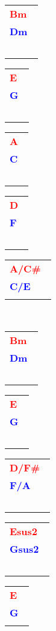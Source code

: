 \documentclass[12pt,a4paper,openany,UTF8]{memoir}
\begin{document}
\begin{tabular}[b]{l}
    \textbf{\textcolor{red}{Bm\ }}\\\textbf{\textcolor{blue}{Dm\ }}\\
    ~\mbox{}\end{tabular}\begin{tabular}[b]{l}
    \textbf{\textcolor{red}{E\ }}\\\textbf{\textcolor{blue}{G\ }}\\
    ~\mbox{}\end{tabular}\begin{tabular}[b]{l}
    \textbf{\textcolor{red}{A\ }}\\\textbf{\textcolor{blue}{C\ }}\\
    ~\mbox{}\end{tabular}\begin{tabular}[b]{l}
    \textbf{\textcolor{red}{D\ }}\\\textbf{\textcolor{blue}{F\ }}\\
    ~\mbox{}\end{tabular}\begin{tabular}[b]{l}
    \textbf{\textcolor{red}{A/C\#\ }}\\\textbf{\textcolor{blue}{C/E\ }}\\
    \mbox{}\end{tabular}\\
\begin{tabular}[b]{l}
    \textbf{\textcolor{red}{Bm\ }}\\\textbf{\textcolor{blue}{Dm\ }}\\
    ~\mbox{}\end{tabular}\begin{tabular}[b]{l}
    \textbf{\textcolor{red}{E\ }}\\\textbf{\textcolor{blue}{G\ }}\\
    ~\mbox{}\end{tabular}\begin{tabular}[b]{l}
    \textbf{\textcolor{red}{D/F\#\ }}\\\textbf{\textcolor{blue}{F/A\ }}\\
    ~\mbox{}\end{tabular}\begin{tabular}[b]{l}
    \textbf{\textcolor{red}{Esus2\ }}\\\textbf{\textcolor{blue}{Gsus2\ }}\\
    ~\mbox{}\end{tabular}\begin{tabular}[b]{l}
    \textbf{\textcolor{red}{E\ }}\\\textbf{\textcolor{blue}{G\ }}\\
    \mbox{}\end{tabular}
\end{document}
